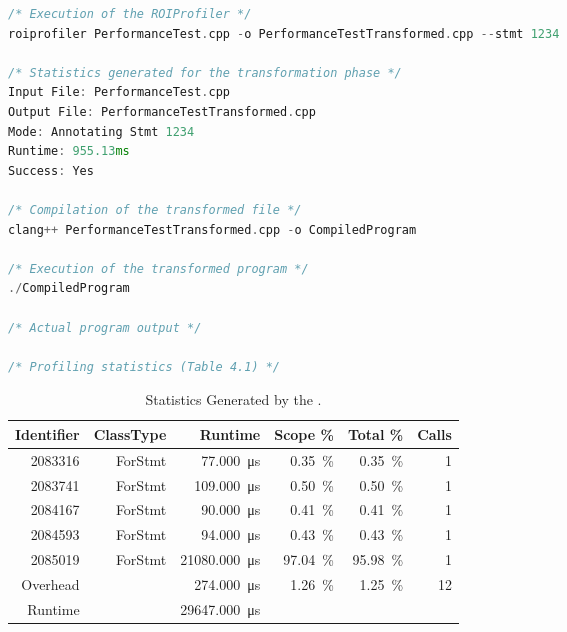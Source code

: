 \begin{lstlisting}[float, language=C++, caption=The Command Line Output of the \TOOL., label=lst:b:tool_output]
/* Execution of the ROIProfiler */
roiprofiler PerformanceTest.cpp -o PerformanceTestTransformed.cpp --stmt 1234

/* Statistics generated for the transformation phase */
Input File: PerformanceTest.cpp
Output File: PerformanceTestTransformed.cpp
Mode: Annotating Stmt 1234
Runtime: 955.13ms
Success: Yes

/* Compilation of the transformed file */
clang++ PerformanceTestTransformed.cpp -o CompiledProgram

/* Execution of the transformed program */
./CompiledProgram

/* Actual program output */

/* Profiling statistics (Table 4.1) */
\end{lstlisting}

\begin{table}
  \centering
  \caption{Statistics Generated by the \TOOL.}
  \begin{tabular}{rrrrrr}
    \toprule
    Identifier & ClassType & Runtime                       & Scope \%             & Total \%             & Calls \\
    \midrule
    2083316    & ForStmt   & \SI{77.000}{\micro\second}    & \SI{0.35}{\percent}  & \SI{0.35}{\percent}  & 1     \\
    2083741    & ForStmt   & \SI{109.000}{\micro\second}   & \SI{0.50}{\percent}  & \SI{0.50}{\percent}  & 1     \\
    2084167    & ForStmt   & \SI{90.000}{\micro\second}    & \SI{0.41}{\percent}  & \SI{0.41}{\percent}  & 1     \\
    2084593    & ForStmt   & \SI{94.000}{\micro\second}    & \SI{0.43}{\percent}  & \SI{0.43}{\percent}  & 1     \\
    2085019    & ForStmt   & \SI{21080.000}{\micro\second} & \SI{97.04}{\percent} & \SI{95.98}{\percent} & 1     \\
    Overhead   &           & \SI{274.000}{\micro\second}   & \SI{1.26}{\percent}  & \SI{1.25}{\percent}  & 12    \\
    \midrule
    Runtime    &           & \SI{29647.000}{\micro\second} &                      &                              \\
    \bottomrule
  \end{tabular}
  \label{tab:b:display_data}
\end{table}


